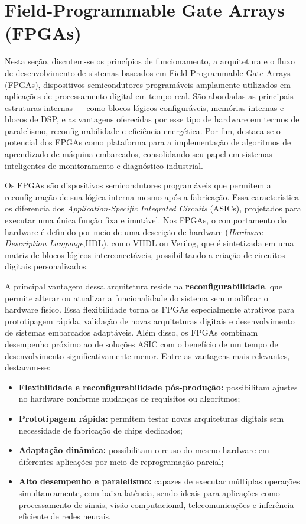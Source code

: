 \section{Field-Programmable Gate Arrays (FPGAs)}

Nesta seção, discutem-se os princípios de funcionamento, a arquitetura e o fluxo de desenvolvimento de sistemas baseados em Field-Programmable Gate Arrays (FPGAs), dispositivos semicondutores programáveis amplamente utilizados em aplicações de processamento digital em tempo real. São abordadas as principais estruturas internas — como blocos lógicos configuráveis, memórias internas e blocos de DSP, e as vantagens oferecidas por esse tipo de hardware em termos de paralelismo, reconfigurabilidade e eficiência energética. Por fim, destaca-se o potencial dos FPGAs como plataforma para a implementação de algoritmos de aprendizado de máquina embarcados, consolidando seu papel em sistemas inteligentes de monitoramento e diagnóstico industrial.

Os FPGAs são dispositivos semicondutores programáveis que permitem a reconfiguração de sua lógica interna mesmo após a fabricação. Essa característica os diferencia dos \textit{Application-Specific Integrated Circuits} (ASICs), projetados para executar uma única função fixa e imutável. Nos FPGAs, o comportamento do hardware é definido por meio de uma descrição de hardware (\textit{Hardware Description Language},HDL), como VHDL ou Verilog, que é sintetizada em uma matriz de blocos lógicos interconectáveis, possibilitando a criação de circuitos digitais personalizados.

A principal vantagem dessa arquitetura reside na \textbf{reconfigurabilidade}, que permite alterar ou atualizar a funcionalidade do sistema sem modificar o hardware físico. Essa flexibilidade torna os FPGAs especialmente atrativos para prototipagem rápida, validação de novas arquiteturas digitais e desenvolvimento de sistemas embarcados adaptáveis. Além disso, os FPGAs combinam desempenho próximo ao de soluções ASIC com o benefício de um tempo de desenvolvimento significativamente menor. Entre as vantagens mais relevantes, destacam-se:

\begin{itemize}
    \item \textbf{Flexibilidade e reconfigurabilidade pós-produção:} possibilitam ajustes no hardware conforme mudanças de requisitos ou algoritmos;
    \item \textbf{Prototipagem rápida:} permitem testar novas arquiteturas digitais sem necessidade de fabricação de chips dedicados;
    \item \textbf{Adaptação dinâmica:} possibilitam o reuso do mesmo hardware em diferentes aplicações por meio de reprogramação parcial;
	\item \textbf{Alto desempenho e paralelismo:} capazes de executar múltiplas operações simultaneamente, com baixa latência, sendo ideais para aplicações como processamento de sinais, visão computacional, telecomunicações e inferência eficiente de redes neurais.
\end{itemize}

